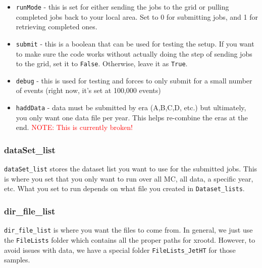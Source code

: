 \begin{itemize}
    \item \verb|runMode| - this is set for either sending the jobs to the grid or pulling completed jobs back to your local area. Set to 0 for submitting jobs, and 1 for retrieving completed ones.
    \item \verb|submit| - this is a boolean that can be used for testing the setup. If you want to make sure the code works without actually doing the step of sending jobs to the grid, set it to \verb|False|. Otherwise, leave it as \verb|True|.
    \item \verb|debug| - this is used for testing and forces to only submit for a small number of events (right now, it's set at 100,000 events)
    \item \verb|haddData| - data must be submitted by era (A,B,C,D, etc.) but ultimately, you only want one data file per year. This helps re-combine the eras at the end. \textcolor{red}{NOTE: This is currently broken!}
\end{itemize}

\subsubsection{dataSet\_list}
\verb|dataSet_list| stores the dataset list you want to use for the submitted jobs. This is where you set that you only want to run over all MC, all data, a specific year, etc. What you set to run depends on what file you created in \verb|Dataset_lists|.

\subsubsection{dir\_file\_list}
\verb|dir_file_list| is where you want the files to come from. In general, we just use the \verb|FileLists| folder which contains all the proper paths for xrootd. However, to avoid issues with data, we have a special folder \verb|FileLists_JetHT| for those samples.
